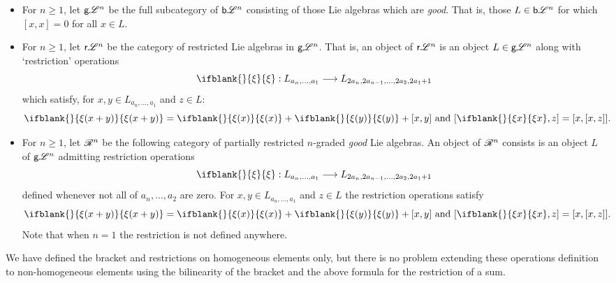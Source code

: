 \documentclass[11pt]{article}
\newcommand{\GS}[1]{\scrE^{#1}}
\newcommand{\RestLie}[1]{\mathsf{r}{\scrL}^{#1}}%
\newcommand{\GoodLie}[1]{\mathsf{g}{\scrL}^{#1}}%
\newcommand{\BadLie}[1]{\mathsf{b}{\scrL}^{#1}}%
\newcommand{\PRLie}[1]{\scrR^{#1}}%
\newcommand{\Fr}[2][]{\ifblank{#1}{#2}{#2_{#1}}}
\newcommand{\restn}[2][]{\ifblank{#1}{\xi{#2}}{\xi_{#1}{#2}}}%
\begin{document}
\begin{CategoriesOfInterest}
\begin{itemize}
\item For $n\geq1$, let $\GoodLie{n}$ be the full subcategory of $\BadLie{n}$ consisting of those Lie algebras which are \emph{good}. That is, those $L\in\BadLie{n}$ for which $[x,x]=0$ for all $x\in L$.
\item For $n\geq1$, let $\RestLie{n}$ be the category of restricted Lie algebras in $\GoodLie{n}$. That is, an object of $\RestLie{n}$ is an object $L\in\GoodLie{n}$ along with `restriction' operations
\[\restn{}:L_{a_n,\ldots,a_1}\to L_{2a_n,2a_{n-1},\ldots,2a_2,2a_1+1}\]
which satisfy, for $x,y\in L_{a_n,\ldots,a_1}$ and $z\in L$: \[\restn{(x+y)}=\restn{(x)}+\restn{(y)}+[x,y]\textup{ and }[\restn{x},z]=[x,[x,z]].\]
\item For $n\geq1$, let $\PRLie{n}$ be the following category of partially restricted $n$-graded \emph{good} Lie algebras. An object of $\PRLie{n}$ consists is an object $L$ of $\GoodLie{n}$
admitting restriction operations
\[\restn{}:L_{a_n,\ldots,a_1}\to L_{2a_n,2a_{n-1},\ldots,2a_2,2a_1+1}\]
defined whenever not all of $a_n,\ldots,a_{2}$ are zero. %
For $x,y\in L_{a_n,\ldots,a_1}$ and $z\in L$ the restriction operations satisfy \[\restn{(x+y)}=\restn{(x)}+\restn{(y)}+[x,y]\textup{ and }[\restn{x},z]=[x,[x,z]].\]
Note that when $n=1$ the restriction is not defined anywhere.
\end{itemize}
We have defined the bracket and restrictions on homogeneous elements only, but there is no problem extending these operations definition to non-homogeneous elements using the bilinearity of the bracket and the above formula for the restriction of a sum.


\end{CategoriesOfInterest}
\end{document}
